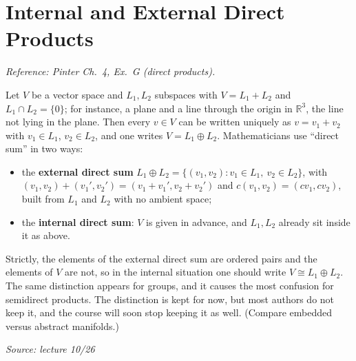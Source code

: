 \documentclass[11pt]{report}
\newcommand{\srcline}[1]{\par\hfill{\footnotesize\textit{Source: #1}}}
\begin{document}
\section{Internal and External Direct Products}\label{sec:internal-direct-products}

\textit{Reference: Pinter Ch.\ 4, Ex.\ G (direct products).}

\begin{rembox}\label{rem:two-meanings-direct-sum}
Let $V$ be a vector space and $L_1, L_2$ subspaces with $V = L_1 + L_2$ and $L_1 \cap L_2 = \{0\}$; for instance, a plane and a line through the origin in $\mathbb{R}^3$, the line not lying in the plane. Then every $v \in V$ can be written uniquely as $v = v_1 + v_2$ with $v_1 \in L_1$, $v_2 \in L_2$, and one writes $V = L_1 \oplus L_2$. Mathematicians use ``direct sum'' in two ways:
\begin{itemize}[nosep]
    \item the \textbf{external direct sum} $L_1 \oplus L_2 = \{(v_1, v_2) : v_1 \in L_1,\ v_2 \in L_2\}$, with $(v_1, v_2) + (v_1', v_2') = (v_1 + v_1', v_2 + v_2')$ and $c(v_1, v_2) = (cv_1, cv_2)$, built from $L_1$ and $L_2$ with no ambient space;
    \item the \textbf{internal direct sum}: $V$ is given in advance, and $L_1, L_2$ already sit inside it as above.
\end{itemize}
Strictly, the elements of the external direct sum are ordered pairs and the elements of $V$ are not, so in the internal situation one should write $V \cong L_1 \oplus L_2$. The same distinction appears for groups, and it causes the most confusion for semidirect products. The distinction is kept for now, but most authors do not keep it, and the course will soon stop keeping it as well. (Compare embedded versus abstract manifolds.)
\srcline{lecture 10/26}
\end{rembox}

\begin{center}
\end{center}
\end{document}
